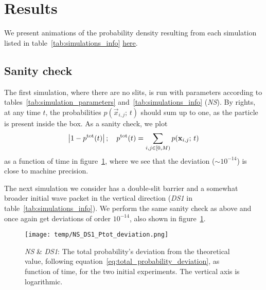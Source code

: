 \section{Results}\label{sec:results}



We present animations of the probability density resulting from each simulation listed in table~\ref{tab:simulations_info} \href{\animlink}{here}. 



\subsection{Sanity check}\label{sec:results:sanity}

    The first simulation, where there are no slits, is run with parameters according to tables~\ref{tab:simulation_parameters} and~\ref{tab:simulations_info} (\textit{NS}). By rights, at any time $t$, the probabilities $p(\vec{x}_{i,j}; \, t)$ should sum up to one, as the particle is present inside the box. As a sanity check, we plot 
    \begin{equation}\label{eq:total_probability_deviation}
        \abs{1- p^\mathrm{tot}(t)}\,; \quad p^\mathrm{tot}(t) = \sum_{i,j\in [0, M)} p(\mathbf{x}_{i,j};\, t)
    \end{equation}
    as a function of time in figure~\ref{fig:ptot_deviation_NS_DS1}, where we see that the deviation ($\sim 10^{-14}$) is close to machine precision.

    The next simulation we consider has a double-slit barrier and a somewhat broader initial wave packet in the vertical direction (\textit{DS1} in table~\ref{tab:simulations_info}). We perform the same sanity check as above and once again get deviations of order $ 10^{-14}$, also shown in figure~\ref{fig:ptot_deviation_NS_DS1}.

    \begin{figure}[ht!]
        \centering
        \texttt{[image: temp/NS\_DS1\_Ptot\_deviation.png]}
        \caption{\textit{NS} \& \textit{DS1}: The total probability's deviation from the theoretical value, following equation~\eqref{eq:total_probability_deviation}, as function of time, for the two initial experiments. The vertical axis is logarithmic.}
        \label{fig:ptot_deviation_NS_DS1}
    \end{figure}


